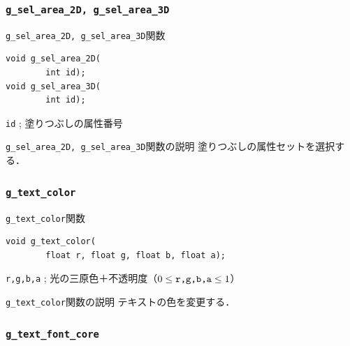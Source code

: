 \documentclass[platex,a4paper,12pt]{jsarticle}%
\begin{document}
\subsubsection{\texttt{g\_sel\_area\_2D, g\_sel\_area\_3D}}

\begin{itembox}[l]{\texttt{g\_sel\_area\_2D, g\_sel\_area\_3D}関数}
\begin{verbatim}
void g_sel_area_2D(
        int id);
void g_sel_area_3D(
        int id);
\end{verbatim}
\verb|id| ; 塗りつぶしの属性番号
\end{itembox}

\begin{itembox}[l]{\texttt{g\_sel\_area\_2D, g\_sel\_area\_3D}関数の説明}
塗りつぶしの属性セットを選択する．
\end{itembox}


\clearpage
\subsubsection{\texttt{g\_text\_color}}

\begin{itembox}[l]{\texttt{g\_text\_color}関数}
\begin{verbatim}
void g_text_color(
        float r, float g, float b, float a);
\end{verbatim}
\verb|r,g,b,a| ; 光の三原色＋不透明度（$0\leq \verb|r,g,b,a| \leq 1$）\\
\end{itembox}

\begin{itembox}[l]{\texttt{g\_text\_color}関数の説明}
テキストの色を変更する．
\end{itembox}

\subsubsection{\texttt{g\_text\_font\_core}}
\end{document}
